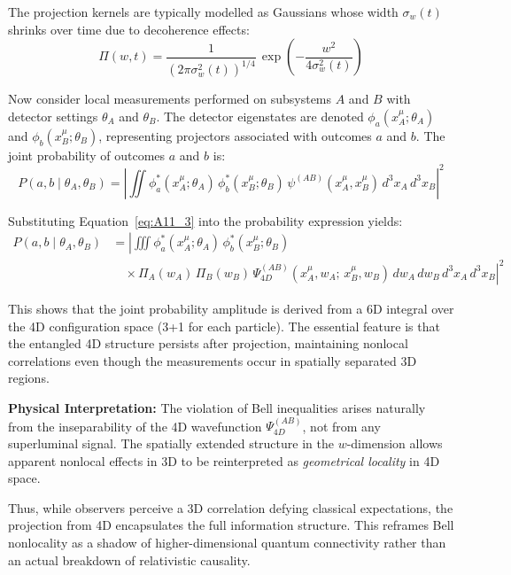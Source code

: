 \documentclass[12pt]{article}
\begin{document}
The projection kernels are typically modelled as Gaussians whose width \(\sigma_w(t)\) shrinks over time due to decoherence effects:
\begin{equation}
\Pi(w, t) = \frac{1}{(2\pi \sigma_w^2(t))^{1/4}}\, \exp\left(-\frac{w^2}{4\sigma_w^2(t)}\right)
\label{eq:A11_4}
\end{equation}

Now consider local measurements performed on subsystems \(A\) and \(B\) with detector settings \(\theta_A\) and \(\theta_B\). The detector eigenstates are denoted \(\phi_a(x_A^\mu; \theta_A)\) and \(\phi_b(x_B^\mu; \theta_B)\), representing projectors associated with outcomes \(a\) and \(b\). The joint probability of outcomes \(a\) and \(b\) is:
\begin{equation}
P(a, b \mid \theta_A, \theta_B) = \left| \iint \phi_a^*(x^\mu_A; \theta_A)\, \phi_b^*(x^\mu_B; \theta_B)\, \psi^{(AB)}(x^\mu_A, x^\mu_B)\, d^3x_A\, d^3x_B \right|^2
\label{eq:A11_5}
\end{equation}

Substituting Equation~\eqref{eq:A11_3} into the probability expression yields:
\begin{align}
P(a, b \mid \theta_A, \theta_B) &= \left| \iiint \phi_a^*(x^\mu_A; \theta_A)\, \phi_b^*(x^\mu_B; \theta_B)\right. \nonumber \\
&\quad \times \left. \Pi_A(w_A)\, \Pi_B(w_B)\, \Psi_{4D}^{(AB)}(x^\mu_A, w_A;\, x^\mu_B, w_B)\, dw_A\, dw_B\, d^3x_A\, d^3x_B \right|^2
\label{eq:A11_6}
\end{align}

This shows that the joint probability amplitude is derived from a 6D integral over the 4D configuration space (3+1 for each particle). The essential feature is that the entangled 4D structure persists after projection, maintaining nonlocal correlations even though the measurements occur in spatially separated 3D regions.

\bigskip
\textbf{Physical Interpretation:} The violation of Bell inequalities arises naturally from the inseparability of the 4D wavefunction \(\Psi_{4D}^{(AB)}\), not from any superluminal signal. The spatially extended structure in the \(w\)-dimension allows apparent nonlocal effects in 3D to be reinterpreted as \emph{geometrical locality} in 4D space.

Thus, while observers perceive a 3D correlation defying classical expectations, the projection from 4D encapsulates the full information structure. This reframes Bell nonlocality as a shadow of higher-dimensional quantum connectivity rather than an actual breakdown of relativistic causality.
\end{document}

